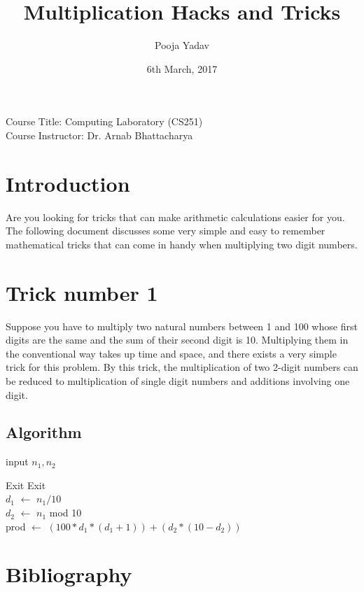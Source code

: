 \documentclass[12pt, a4paper]{article}
\title{Multiplication Hacks and Tricks}
\author{Pooja Yadav}
\date{6th March, 2017}
\begin{document}
\begin{titlepage}
\maketitle
\vspace{4cm}
\centering
Course Title: Computing Laboratory (CS251)\\
Course Instructor: Dr. Arnab Bhattacharya
\end{titlepage}
\section{Introduction}
Are you looking for tricks that can make arithmetic calculations easier for you. The following document discusses some very simple and easy to remember mathematical tricks that can come in handy when multiplying two digit numbers.
\section{Trick number 1}
\label{sec1}
Suppose you have to multiply two natural numbers between 1 and 100 whose first digits are the same and the sum of their second digit is 10. Multiplying them in the conventional way takes up time and space, and there exists a very simple trick for this problem. By this trick, the multiplication of two 2-digit numbers can be reduced to multiplication of single digit numbers and additions involving one digit.
\subsection{Algorithm}
\begin{algorithm}[H]
input $n_1, n_2$
\begin{algorithmic}[1]
\State Exit
\EndIf
{}
\State Exit
\EndIf
\\
$d_1$ $\gets$ $n_1/10$ \\ 
$d_2$ $\gets$ $n_1$ mod 10 \\
prod $\gets$ $(100*d_1*(d_1+1)) + (d_2 * (10 - d_2))$ \\
\end{algorithmic}
\end{algorithm}
\section{Bibliography}


\end{document}
